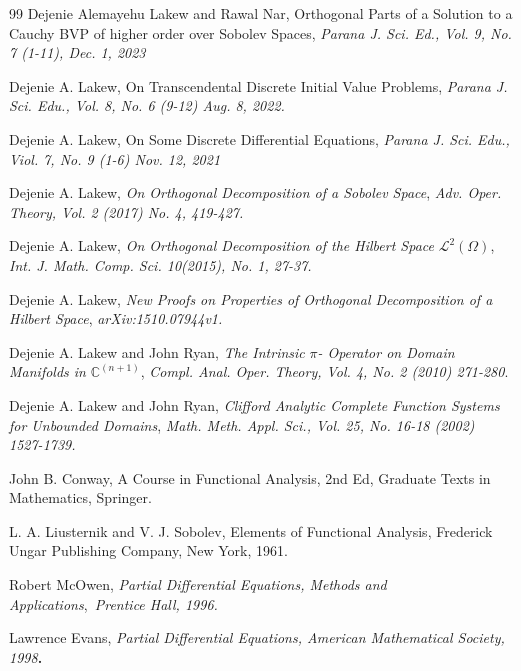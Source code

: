 \documentclass{amsart}%
\providecommand{\U}[1]{\protect\rule{.1in}{.1in}}
\theoremstyle{plain}
\numberwithin{equation}{section}
\begin{document}
\begin{thebibliography}{99}                                                                                               %
Dejenie Alemayehu Lakew and Rawal Nar, Orthogonal Parts
of a Solution to a Cauchy BVP of higher order over Sobolev Spaces,
\textit{Parana J. Sci. Ed., Vol. 9, No. 7 (1-11), Dec. 1, 2023}

Dejenie A. Lakew, On Transcendental Discrete Initial Value
Problems, \textit{Parana J. Sci. Edu., Vol. 8, No. 6 (9-12) Aug. 8, 2022.}

Dejenie A. Lakew, On Some Discrete Differential Equations,
\textit{Parana J. Sci. Edu., Viol. 7, No. 9 (1-6) Nov. 12, 2021}

Dejenie A. Lakew, \textit{On Orthogonal Decomposition of a
Sobolev Space}, \textit{Adv. Oper. Theory, Vol. 2 (2017) No. 4, 419-427.}

Dejenie A. Lakew, \textit{On Orthogonal Decomposition of the
Hilbert Space }$%
\mathcal{L}%
^{2}\left(  \Omega\right)  $, \textit{Int. J. Math. Comp. Sci. 10(2015), No.
1, 27-37.}

Dejenie A. Lakew, \textit{New Proofs on Properties of
Orthogonal Decomposition of a Hilbert Space}, \textit{arXiv:1510.07944v1.}

Dejenie A. Lakew and John Ryan, \textit{The Intrinsic
}$\pi$\textit{- Operator on Domain Manifolds in }$%
\mathbb{C}
^{\left(  n+1\right)  }$, \textit{Compl. Anal. Oper. Theory, Vol. 4, No. 2
(2010) 271-280}.

Dejenie A. Lakew and John Ryan, \textit{Clifford Analytic
Complete Function Systems for Unbounded Domains}, \textit{Math. Meth. Appl.
Sci., Vol. 25, No. 16-18 (2002) 1527-1739.}

John B. Conway, A Course in Functional Analysis, 2nd Ed,
Graduate Texts in Mathematics, Springer.

L. A. Liusternik and V. J. Sobolev, Elements of
Functional Analysis, Frederick Ungar Publishing Company, New York, 1961.

Robert McOwen, \textit{Partial Differential Equations,
Methods and Applications},\textit{\ Prentice Hall, 1996.}

Lawrence Evans, \textit{Partial Differential Equations,
American Mathematical Society, 1998}\textbf{.}


\end{thebibliography}
\end{document}

